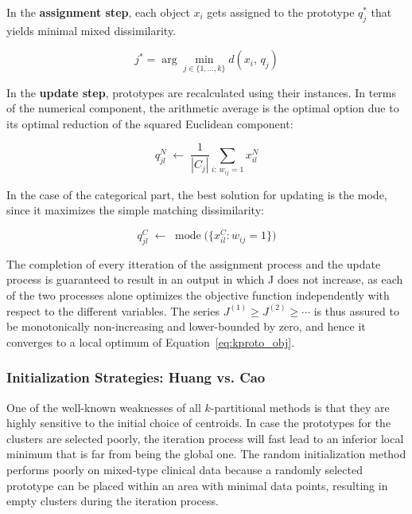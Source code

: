 \vspace{0.5em}

In the \textbf{assignment step}, each object $x_i$ gets assigned to the prototype $q_j^*$ that yields minimal mixed dissimilarity.

\begin{equation}
    j^* = \arg\min_{j \in \{1,\ldots,k\}} d(x_i,\, q_j)
\end{equation}

In the \textbf{update step}, prototypes are recalculated using their instances. In terms of the numerical component, the arithmetic average is the optimal option due to its optimal reduction of the squared Euclidean component:

\begin{equation}
    q_{jl}^{N} \;\leftarrow\; \frac{1}{|C_j|}\sum_{i:\, w_{ij}=1} x_{il}^{N}
\end{equation}

In the case of the categorical part, the best solution for updating is the mode, since it maximizes the simple matching dissimilarity:

\begin{equation}
    q_{jl}^{C} \;\leftarrow\; \operatorname{mode}\bigl(\{x_{il}^{C} : w_{ij} = 1\}\bigr)
\end{equation}

The completion of every itteration of the assignment process and the update process is guaranteed to result in an output in which J does not increase, as each of the two processes alone optimizes the objective function independently with respect to the different variables. The series $J^{(1)} \geq J^{(2)} \geq \cdots$ is thus assured to be monotonically non-increasing and lower-bounded by zero, and hence it converges to a local optimum of Equation~\eqref{eq:kproto_obj}.

\subsubsection*{Initialization Strategies: Huang vs. Cao}

One of the well-known weaknesses of all $k$-partitional methods is that they are highly sensitive to the initial choice of centroids. In case the prototypes for the clusters are selected poorly, the iteration process will fast lead to an inferior local minimum that is far from being the global one. The random initialization method performs poorly on mixed-type clinical data because a randomly selected prototype can be placed within an area with minimal data points, resulting in empty clusters during the iteration process.


